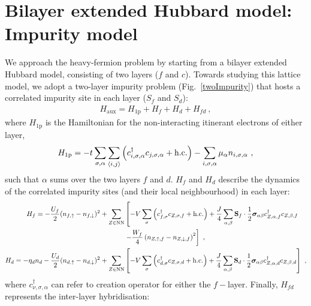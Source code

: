 \documentclass[%
reprint,
superscriptaddress,
groupedaddress,
superscriptaddress,
onecolumn,
10pt
]{revtex4-2}
\begin{document}
\section{Bilayer extended Hubbard model: Impurity model}
We approach the heavy-fermion problem by starting from a bilayer extended Hubbard model, consisting of two layers (\(f\) and \(c\)). Towards studying this lattice model, we adopt a two-layer impurity problem (Fig.~\ref{twoImpurity}) that hosts a correlated impurity site in each layer (\(S_f\) and \(S_d\)):
\begin{equation}\begin{aligned}
	H_\text{aux} = H_\text{1p} + H_f + H_d + H_{fd}~,
\end{aligned}\end{equation}
where \(H_\text{1p}\) is  the Hamiltonian for the non-interacting itinerant electrons of either layer,
\begin{equation}\begin{aligned}
	H_\text{1p} = -t\sum_{\sigma,\alpha}\sum_{\braket{i,j}}\left(c^\dagger_{i,\sigma,\alpha}c_{j,\sigma,\alpha} + \text{h.c.}\right) - \sum_{i,\sigma,\alpha}\mu_\alpha n_{i,\sigma,\alpha}~,
\end{aligned}\end{equation}
such that \(\alpha\) sums over the two layers \(f\) and \(d\). \(H_f\) and \(H_d\) describe the dynamics of the correlated impurity sites (and their local neighbourhood) in each layer:
\begin{equation}\begin{aligned}
	H_f = -\frac{U_f}{2} (n_{f,\uparrow} - n_{f,\downarrow})^2 + \sum_{Z \in \text{NN}}&\left[-V\sum_{\sigma}\left(c^\dagger_{f,\sigma} c_{Z,\sigma,f} + \text{h.c.}\right) + \frac{J}{4}\sum_{\alpha,\beta}{\bf S}_f \cdot \frac{1}{2}{\boldsymbol{\sigma}}_{\alpha\beta}c^\dagger_{Z,\alpha,f}c_{Z,\beta,f} \right.\\
		 &\left.- \frac{W_f}{4} \left(n_{Z,\uparrow,f} - n_{Z,\downarrow,f}\right)^2\right] ~,\\
	H_d = -\eta_d n_{d} - \frac{U_d}{2}(n_{d,\uparrow} - n_{d,\downarrow})^2 + \sum_{Z \in \text{NN}}&\left[-V\sum_{\sigma}\left(c^\dagger_{d,\sigma} c_{Z,\sigma,d} + \text{h.c.}\right) + \frac{J}{4}\sum_{\alpha,\beta}{\bf S}_d \cdot \frac{1}{2}{\boldsymbol{\sigma}}_{\alpha\beta}c^\dagger_{Z,\alpha,d}c_{Z,\beta,d}\right] ~,
\end{aligned}\end{equation}
where \(c^\dagger_{\nu,\sigma,\alpha}\) can refer to creation operator for either the \(f-\)layer. Finally, \(H_{fd}\) represents the inter-layer hybridisation:
\end{document}
